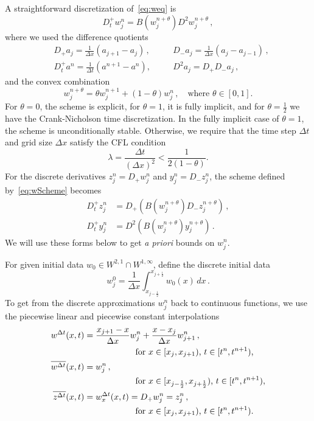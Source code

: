 \documentclass[11pt,leqno]{amsart}
\newcommand{\Dtp}{D_t^+}
\newcommand{\Dp}{D_+}
\newcommand{\Dm}{D_-}
\newcommand{\DD}{D^2}
\newcommand{\wlin}{w^{\Delta t}}
\newcommand{\wcon}{\overline{w^{\Delta t}}}
\newcommand{\zcon}{\overline{z^{\Delta t}}}
\begin{document}
A straightforward discretization of~\eqref{eq:weq} is 
\begin{equation}\label{eq:wScheme}
  \Dtp w^n_j=B(w^{n+\theta}_j)\DD w^{n+\theta}_j\,,
\end{equation}
where we used the difference quotients
\begin{align*}
&  \Dp a_j = \frac{1}{\Delta x} (a_{j+1}-a_j)\,, \quad &&\Dm a_j=\frac{1}{\Delta x} (a_j-a_{j-1})\,,\\
&  \Dtp a^n=\frac{1}{\Delta t} (a^{n+1}-a^n),\quad &&\DD a_j=\Dp\Dm a_j\,, 
\end{align*}
and the convex combination
\begin{equation*}
  w^{n+\theta}_j=\theta w^{n+1}_j + (1-\theta) w^n_j\,,\quad\text{where $\theta\in [0,1]$.}
\end{equation*}
For $\theta=0$, the scheme is explicit, for $\theta=1$, it is fully implicit, and for $\theta=\frac{1}{2} $ we have the Crank-Nicholson time discretization. In the fully implicit case of $\theta=1$, the scheme is unconditionally stable. Otherwise, we require that the time step $\Delta t$ and grid size $\Delta x$ satisfy the CFL condition
\begin{equation}\label{eq:CFL}
  \lambda=\frac{\Delta t}{(\Delta x)^2} < \frac{1}{2(1-\theta)}. 
\end{equation}
For the discrete derivatives $z^n_j=\Dp w^n_j$ and $y^n_j=\Dm z^n_j$, the scheme defined by~\eqref{eq:wScheme} becomes
\begin{align}
  \Dtp z^n_j&=\Dp (B(w^{n+\theta}_j) \Dm z^{n+\theta}_j)\,,\label{eq:zScheme}\\
  \Dtp y^n_j&= \DD (B(w^{n+\theta}_j) y^{n+\theta}_j)\,.\label{eq:yScheme}
\end{align}
We will use these forms below to get \emph{a priori} bounds on $w^n_j$.

For given initial data $w_0\in W^{2,1}\cap W^{1,\infty}$, define the discrete initial data
\begin{equation}\label{eq:ID}
  w^0_j=\frac{1}{\Delta x} \int_{x_{j-\frac{1}{2}}}^{x_{j+\frac{1}{2}}} w_0(x) \,dx\,.
\end{equation}
To get from the discrete approximations $w^n_j$ back to continuous functions, we use the piecewise linear and piecewise constant interpolations
\begin{align}
  \wlin(x,t)&=\frac{x_{j+1}-x}{\Delta x} w^n_j + \frac{x-x_j}{\Delta x} w^n_{j+1}\,,\label{eq:wlin}\\ 
  &\qquad\qquad\qquad\text{for $x\in [x_j,x_{j+1})$, $t\in [t^n,t^{n+1})$,}\notag\\
\wcon(x,t)&=w^n_j\,, \\ 
&\qquad\qquad\qquad\text{for $x\in [x_{j-\frac{1}{2}},x_{j+\frac{1}{2}})$, $t\in [t^n, t^{n+1})$},\notag\\
\zcon(x,t)&=\wlin_x(x,t)=\Dp w^n_j=z^n_j\,,\\ 
&\qquad\qquad\qquad\text{for $x\in [x_j,x_{j+1})$, $t\in [t^n,t^{n+1})$.}\notag
\end{align}
\end{document}
